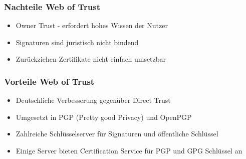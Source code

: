 \documentclass[a4paper,10pt]{scrartcl}
\begin{document}
        \subsubsection{ Nachteile Web of Trust }
        \begin{itemize}
         \item Owner Trust - erfordert hohes Wissen der Nutzer
         \item Signaturen sind juristisch nicht bindend
         \item Zurückziehen Zertifikate nicht einfach umsetzbar
        \end{itemize}
        \subsubsection{ Vorteile Web of Trust }
        \begin{itemize}
         \item Deutschliche Verbesserung gegenüber Direct Trust
         \item Umgesetzt in PGP (Pretty good Privacy) und OpenPGP
         \item Zahlreiche Schlüsselserver für Signaturen und öffentliche Schlüssel
         \item Einige Server bieten Certification Service für PGP und GPG Schlüssel an
        \end{itemize}
        
\end{document}

